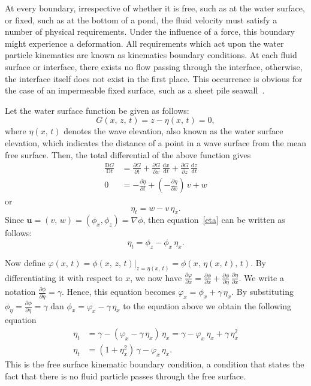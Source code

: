 \documentclass[12pt,a4paper]{report}
\begin{document}
At every boundary, irrespective of whether it is free, such as at the water surface, or fixed, such as at the bottom of a pond, the fluid velocity must satisfy a number of physical requirements. Under the influence of a force, this boundary might experience a deformation. All requirements which act upon the water particle kinematics are known as kinematics boundary conditions. At each fluid surface or interface, there exists no flow passing through the interface, otherwise, the interface itself does not exist in the first place. This occurrence is obvious for the case of an impermeable fixed surface, such as a sheet pile seawall~\cite{drg}.

Let the water surface function be given as follows:
\begin{equation}
G(x,\,z,\,t) = z - \eta(x,\,t) = 0,
\end{equation}
where $\eta(x,\,t)$ denotes the wave elevation, also known as the water surface elevation, which indicates the distance of a point in a wave surface from the mean free surface.
Then, the total differential of the above function gives  
\begin{align}
\frac{\mathrm{D}G}{\mathrm{D}t} &= \frac{\partial G}{\partial t} + \frac{\partial G}{\partial x} \, \frac{\mathrm{d}x}{\mathrm{d}t} + \frac{\partial G}{\partial z} \, \frac{\mathrm{d}z}{\mathrm{d}t} \\
0 &= -\frac{\partial \eta}{\partial t} + \left(-\frac{\partial \eta}{\partial x} \right) \,v + w
\end{align}
or
\begin{equation}
\eta_{t} = w - v \,\eta_{x}.  \label{eta}
\end{equation}
Since $\mathbf{u} = (v,\,w)= (\phi_{x}, \phi_{z}) = \nabla \phi$, then equation~\eqref{eta} can be written as follows:
\begin{equation}
\eta_{t} = \phi_{z} - \phi_{x} \,\eta_{x}.
\end{equation}

Now define $\varphi(x,\,t)= \left. \phi(x,\,z,\,t)\right|_{z=\eta(x,\,t)} = \phi(x,\,\eta(x,\,t),\,t)$. By differentiating it with respect to $x$, we now have $\displaystyle \frac{\partial\varphi}{\partial x} = \frac{\partial\phi}{\partial x} + \frac{\partial\phi}{\partial\eta} \,\frac{\partial\eta}{\partial x}$. We write a notation $\frac{\partial \phi}{\partial \eta} = \gamma$. Hence, this equation becomes $\varphi_{x} = \phi_{x} + \gamma\,\eta_{x}$. By substituting $\phi_{\eta} = \frac{\partial \phi}{\partial \eta} = \gamma$ dan $\phi_{x} = \varphi_{x} - \gamma \,\eta_{x}$ to the equation above we obtain the following equation
\begin{align}
\eta_{t} &= \gamma - \left(\varphi_{x} - \gamma\, \eta_{x} \right) \, \eta_{x} = \gamma - \varphi_{x} \,\eta_{x} + \gamma \, \eta_{x}^2 \\
\eta_{t} &= \left(1 + \eta_{x}^2 \right) \, \gamma - \varphi_{x} \,\eta_{x}.
\end{align}
This is the free surface kinematic boundary condition, a condition that states the fact that there is no fluid particle passes through the free surface.
\end{document}
